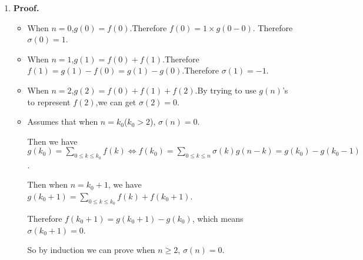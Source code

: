 \documentclass[12pt,a4paper]{article}
\makeatletter
\newtheorem*{solution}{Solution}
\theoremstyle{definition}
\renewenvironment{solution}[1][Solution] {\par\pushQED{\qed}\normalfont\topsep6\p@\@plus6\p@\relax\trivlist\item[\hskip\labelsep\bfseries#1\@addpunct{.}]\ignorespaces}{\popQED\endtrivlist\@endpefalse} \makeatother
\makeatother
\begin{document}
\begin{enumerate}
\begin{solution}
	    	\textbf{Proof.}
	    	\begin{itemize}
	    		\item 
	    		    When $n=0$,$g(0)=f(0)$.Therefore $f(0)=1\times g(0-0)$. Therefore $\sigma(0)=1$.
	    		\item 
	    		    When $n=1$,$g(1)=f(0)+f(1)$.Therefore $f(1)=g(1)-f(0)=g(1)-g(0)$.Therefore $\sigma(1)=-1$.
	    		\item 
	    		    When $n=2$,$g(2)=f(0)+f(1)+f(2)$.By trying to use $g(n)$'s to represent $f(2)$,we can get $\sigma(2)=0$.
	    		\item 
	    		    Assumes that when $n=k_0$($k_0>2$), $\sigma(n)=0$.
	    		    
	    		    Then we have $g(k_0)=\sum_{0\le k\le k_0}f(k)\Leftrightarrow f(k_0)=\sum_{0 \le k\le n}\sigma(k)g(n-k)=g(k_0)-g(k_0-1)$.
	    		    
	    		    Then when $n=k_0+1$, we have $g(k_0+1)=\sum_{0\le k \le k_0}f(k)+f(k_0+1)$.
	    		    
	    		    Therefore $f(k_0+1)=g(k_0+1)-g(k_0)$, which means $\sigma(k_0+1)=0$.
	    		    
	    		    So by induction we can prove when $n\ge 2$, $\sigma(n)=0$.
	    	\end{itemize}
	    	      

\end{solution}
\end{enumerate}
\end{document}
